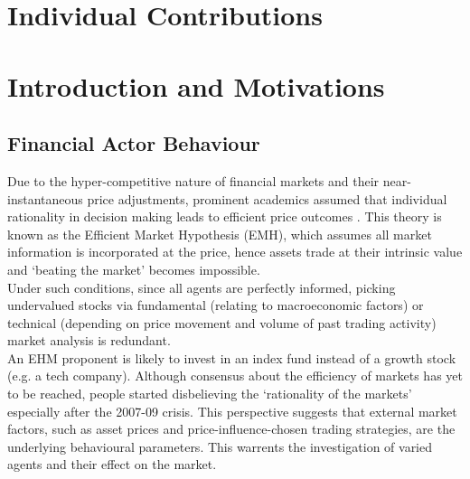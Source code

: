 \documentclass[11pt]{article}
\begin{document}
\newline

\section{Individual Contributions}

\section{Introduction and Motivations}
\subsection{Financial Actor Behaviour}

Due to the hyper-competitive nature of financial markets and their near-instantaneous price adjustments, prominent academics assumed that individual rationality in decision making leads to efficient price outcomes \citep{zeckhauser1991nonrational}. This theory is known as the Efficient Market Hypothesis (EMH), which assumes all market information is incorporated at the price, hence assets trade at their intrinsic value and `beating the market' becomes impossible. \\
Under such conditions, since all agents are perfectly informed, picking undervalued stocks via fundamental (relating to macroeconomic factors) or technical (depending on price movement and volume of past trading activity) market analysis is redundant. \\
An EHM proponent is likely to invest in an index fund instead of a growth stock (e.g. a tech company). Although consensus about the efficiency of markets has yet to be reached, people started disbelieving the ‘rationality of the markets’ especially after the 2007-09 crisis. This perspective suggests that external market factors, such as asset prices and price-influence-chosen trading strategies, are the underlying behavioural parameters. This warrents the investigation of varied agents and their effect on the market. \\
\end{document}
